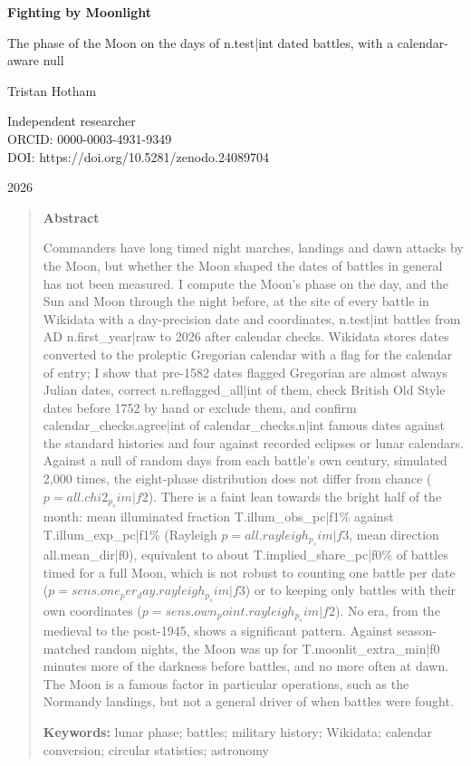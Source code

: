\documentclass[11pt,a4paper]{article}
\begin{document}
\begin{center}
{\Large\bfseries Fighting by Moonlight\par}
\vspace{0.4em}
{\large The phase of the Moon on the days of {{n.test|int}} dated battles, with a calendar-aware null\par}
\vspace{1.2em}
{\large Tristan Hotham\par}
\vspace{0.3em}
{\small Independent researcher\\
ORCID: 0000-0003-4931-9349\\
DOI: https://doi.org/10.5281/zenodo.24089704\par}
\vspace{0.8em}
2026
\end{center}

\begin{quote}
\small
\begin{center}\textbf{Abstract}\end{center}
Commanders have long timed night marches, landings and dawn attacks by the Moon, but whether the Moon shaped the dates of battles in general has not been measured. I compute the Moon's phase on the day, and the Sun and Moon through the night before, at the site of every battle in Wikidata with a day-precision date and coordinates, {{n.test|int}} battles from AD {{n.first_year|raw}} to 2026 after calendar checks. Wikidata stores dates converted to the proleptic Gregorian calendar with a flag for the calendar of entry; I show that pre-1582 dates flagged Gregorian are almost always Julian dates, correct {{n.reflagged_all|int}} of them, check British Old Style dates before 1752 by hand or exclude them, and confirm {{calendar_checks.agree|int}} of {{calendar_checks.n|int}} famous dates against the standard histories and four against recorded eclipses or lunar calendars. Against a null of random days from each battle's own century, simulated 2,000 times, the eight-phase distribution does not differ from chance ($p={{all.chi2_p_sim|f2}}$). There is a faint lean towards the bright half of the month: mean illuminated fraction {{T.illum_obs_pc|f1}}\% against {{T.illum_exp_pc|f1}}\% (Rayleigh $p={{all.rayleigh_p_sim|f3}}$, mean direction {{all.mean_dir|f0}}\textdegree), equivalent to about {{T.implied_share_pc|f0}}\% of battles timed for a full Moon, which is not robust to counting one battle per date ($p={{sens.one_per_day.rayleigh_p_sim|f3}}$) or to keeping only battles with their own coordinates ($p={{sens.own_point.rayleigh_p_sim|f2}}$). No era, from the medieval to the post-1945, shows a significant pattern. Against season-matched random nights, the Moon was up for {{T.moonlit_extra_min|f0}} minutes more of the darkness before battles, and no more often at dawn. The Moon is a famous factor in particular operations, such as the Normandy landings, but not a general driver of when battles were fought.

\textbf{Keywords:} lunar phase; battles; military history; Wikidata; calendar conversion; circular statistics; astronomy
\end{quote}
\end{document}
